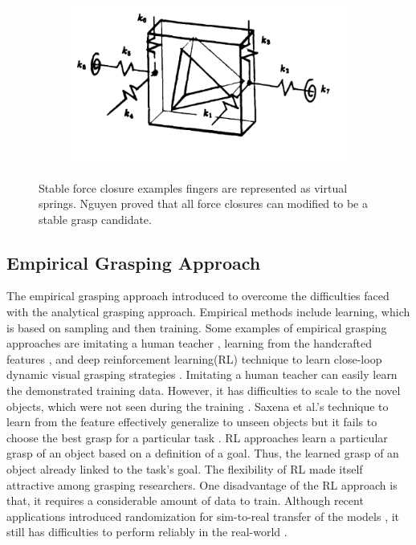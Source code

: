 \begin{figure}
\begin{subfigure}{0.31\textwidth}
      \caption{} \label{fig:1b}
    \end{subfigure}%
    \hspace*{\fill}   %
    \begin{subfigure}{0.31\textwidth}
      \includegraphics[width=\linewidth]{figures/graspC.png}
      \caption{} \label{fig:1c}
    \end{subfigure}

\caption{Stable force closure examples fingers are represented as virtual springs. Nguyen proved that all force closures can modified to be a stable grasp candidate\cite{Nguyen1987}.} \label{fig:1}
\end{figure}

\subsection{Empirical Grasping Approach}


The empirical grasping approach introduced to overcome the difficulties faced with the analytical grasping approach. Empirical methods include learning, which is based on sampling and then training. Some examples of empirical grasping approaches are imitating a human teacher \cite{Ekvall2004}, learning from the handcrafted features \cite{Saxena2008},  and deep reinforcement learning(RL) technique to learn close-loop dynamic visual grasping strategies \cite{Kalashnikov2018}. Imitating a human teacher can easily learn the demonstrated training data. However, it has difficulties to scale to the novel objects, which were not seen during the training \cite{Sahbani2012}. Saxena et al.’s technique to learn from the feature effectively generalize to unseen objects but it fails to choose the best grasp for a particular task \cite{Sahbani2012}. RL approaches learn a particular grasp of an object based on a definition of a goal. Thus, the learned grasp of an object already linked to the task's goal. The flexibility of RL made itself attractive among grasping researchers. One disadvantage of the RL approach is that, it requires a considerable amount of data to train. Although recent applications introduced randomization for sim-to-real transfer of the models \cite{Andrychowicz2020}, it still has difficulties to perform reliably in the real-world \cite{Caldera2018}.

